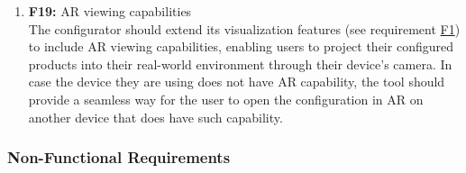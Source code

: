 \begin{enumerate}
\item \textbf{F19:} \label{itm:F19} AR viewing capabilities
\vspace{2pt}
\\The configurator should extend its visualization features (see requirement \hyperref[itm:F1]{F1}) to include AR viewing capabilities, enabling users to project their configured products into their real-world environment through their device's camera. In case the device they are using does not have AR capability, the tool should provide a seamless way for the user to open the configuration in AR on another device that does have such capability.
\vspace{4pt}

\end{enumerate}


\subsubsection{Non-Functional Requirements}

